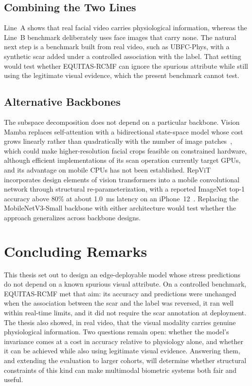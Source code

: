 \subsection{Combining the Two Lines}
Line~A shows that real facial video carries physiological information, whereas the Line~B benchmark deliberately uses face images that carry none. The natural next step is a benchmark built from real video, such as UBFC-Phys, with a synthetic scar added under a controlled association with the label. That setting would test whether EQUITAS-RCMF can ignore the spurious attribute while still using the legitimate visual evidence, which the present benchmark cannot test.

\subsection{Alternative Backbones}
The subspace decomposition does not depend on a particular backbone. Vision Mamba replaces self-attention with a bidirectional state-space model whose cost grows linearly rather than quadratically with the number of image patches~\cite{zhu2024vim}, which could make higher-resolution facial crops feasible on constrained hardware, although efficient implementations of its scan operation currently target GPUs, and its advantage on mobile CPUs has not been established. RepViT incorporates design elements of vision transformers into a mobile convolutional network through structural re-parameterization, with a reported ImageNet top-1 accuracy above 80\% at about 1.0~ms latency on an iPhone~12~\cite{wang2024repvit}. Replacing the MobileNetV3-Small backbone with either architecture would test whether the approach generalizes across backbone designs.

\section{Concluding Remarks}
This thesis set out to design an edge-deployable model whose stress predictions do not depend on a known spurious visual attribute. On a controlled benchmark, EQUITAS-RCMF met that aim: its accuracy and predictions were unchanged when the association between the scar and the label was reversed, it ran well within real-time limits, and it did not require the scar annotation at deployment. The thesis also showed, in real video, that the visual modality carries genuine physiological information. Two questions remain open: whether the model's invariance comes at a cost in accuracy relative to physiology alone, and whether it can be achieved while also using legitimate visual evidence. Answering them, and extending the evaluation to larger cohorts, will determine whether structural constraints of this kind can make multimodal biometric systems both fair and useful.
